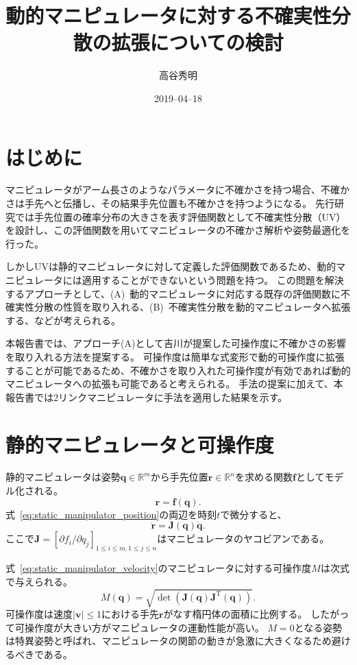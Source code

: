 \documentclass[10pt,a4j,twocolumn]{ltjsarticle}
\title{動的マニピュレータに対する不確実性分散の拡張についての検討} %
\author{高谷秀明}                              %
\date{2019--04--18}                              %
\begin{document}
\maketitle

\section{はじめに}

マニピュレータがアーム長さのようなパラメータに不確かさを持つ場合、不確かさは手先へと伝播し、その結果手先位置も不確かさを持つようになる。
先行研究では手先位置の確率分布の大きさを表す評価関数として不確実性分散（UV）を設計し、この評価関数を用いてマニピュレータの不確かさ解析や姿勢最適化を行った。

しかしUVは静的マニピュレータに対して定義した評価関数であるため、動的マニピュレータには適用することができないという問題を持つ。
この問題を解決するアプローチとして、(A)~動的マニピュレータに対応する既存の評価関数に不確実性分散の性質を取り入れる、(B)~不確実性分散を動的マニピュレータへ拡張する、などが考えられる。

本報告書では、アプローチ(A)として吉川が提案した可操作度に不確かさの影響を取り入れる方法を提案する。
可操作度は簡単な式変形で動的可操作度に拡張することが可能であるため、不確かさを取り入れた可操作度が有効であれば動的マニピュレータへの拡張も可能であると考えられる。
手法の提案に加えて、本報告書では2リンクマニピュレータに手法を適用した結果を示す。

\section{静的マニピュレータと可操作度}

静的マニピュレータは姿勢$\bm{q} \in \mathbb{R}^{m}$から手先位置$\bm{r} \in \mathbb{R}^{n}$を求める関数$\bm{f}$としてモデル化される。
\begin{equation}
  \bm{r} = \bm{f}(\bm{q}). \label{eq:static_manipulator_position}
\end{equation}
式~\eqref{eq:static_manipulator_position}の両辺を時刻$t$で微分すると、
\begin{equation}
  \dot{\bm{r}} = \bm{J}(\bm{q}) \dot{\bm{q}}. \label{eq:static_manipulator_velocity}
\end{equation}
ここで$\bm{J} = [\partial f_{i} / \partial q_{j}]_{1 \leq i \leq m, 1 \leq j \leq n}$はマニピュレータのヤコビアンである。

式~\eqref{eq:static_manipulator_velocity}のマニピュレータに対する可操作度$M$は次式で与えられる。
\begin{equation}
  M(\bm{q}) = \sqrt{\det \left( \bm{J}(\bm{q}) \bm{J}^{\mathrm{T}}(\bm{q}) \right)}.
\end{equation}
可操作度は速度$|\bm{v}| \leq 1$における手先$\bm{r}$がなす楕円体の面積に比例する。
したがって可操作度が大きい方がマニピュレータの運動性能が高い。
$M = 0$となる姿勢は特異姿勢と呼ばれ、マニピュレータの関節の動きが急激に大きくなるため避けるべきである。
\end{document}
